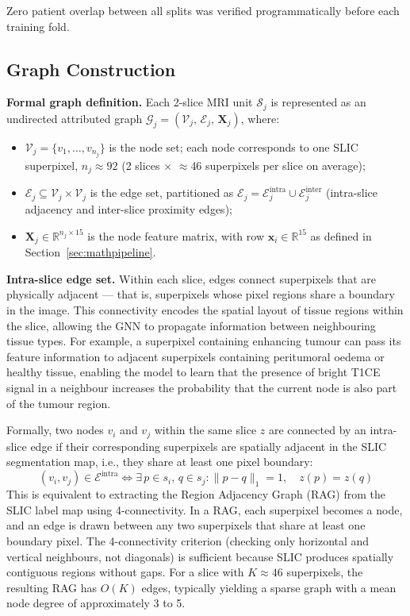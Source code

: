 \documentclass{article}
\begin{document}
Zero patient overlap between all splits was verified programmatically before
each training fold.

\subsection{Graph Construction}
\label{sec:graphconst}

\textbf{Formal graph definition.}
Each 2-slice MRI unit $\mathcal{S}_j$ is represented as an undirected attributed
graph $\mathcal{G}_j = (\mathcal{V}_j,\, \mathcal{E}_j,\, \mathbf{X}_j)$, where:
\begin{itemize}
    \item $\mathcal{V}_j = \{v_1, \dots, v_{n_j}\}$ is the node set; each node
    corresponds to one SLIC superpixel, $n_j \approx 92$ (2 slices
    $\times$ $\approx$46 superpixels per slice on average);
    \item $\mathcal{E}_j \subseteq \mathcal{V}_j \times \mathcal{V}_j$ is the
    edge set, partitioned as
    $\mathcal{E}_j = \mathcal{E}_j^{\text{intra}} \cup \mathcal{E}_j^{\text{inter}}$
    (intra-slice adjacency and inter-slice proximity edges);
    \item $\mathbf{X}_j \in \mathbb{R}^{n_j \times 15}$ is the node feature matrix,
    with row $\mathbf{x}_i \in \mathbb{R}^{15}$ as defined in
    Section~\ref{sec:mathpipeline}.
\end{itemize}

\textbf{Intra-slice edge set.}
Within each slice, edges connect superpixels that are physically adjacent ---
that is, superpixels whose pixel regions share a boundary in the image. This
connectivity encodes the spatial layout of tissue regions within the slice,
allowing the GNN to propagate information between neighbouring tissue
types. For example, a superpixel containing enhancing tumour can pass its
feature information to adjacent superpixels containing peritumoral oedema
or healthy tissue, enabling the model to learn that the presence of bright
T1CE signal in a neighbour increases the probability that the current node
is also part of the tumour region.

Formally, two nodes $v_i$ and $v_j$ within the same slice $z$ are connected by
an intra-slice edge if their corresponding superpixels are spatially adjacent in
the SLIC segmentation map, i.e., they share at least one pixel boundary:
\[
    (v_i, v_j) \in \mathcal{E}^{\text{intra}} \iff
    \exists\, p \in s_i,\, q \in s_j :
    \|p - q\|_1 = 1, \quad z(p) = z(q)
\]
This is equivalent to extracting the Region Adjacency Graph (RAG) from the SLIC
label map using 4-connectivity. In a RAG, each superpixel becomes a node, and an
edge is drawn between any two superpixels that share at least one boundary pixel.
The 4-connectivity criterion (checking only horizontal and vertical neighbours,
not diagonals) is sufficient because SLIC produces spatially contiguous regions
without gaps. For a slice with $K \approx 46$ superpixels, the resulting RAG has
$O(K)$ edges, typically yielding a sparse graph with a mean node degree of
approximately 3 to 5.
\end{document}
